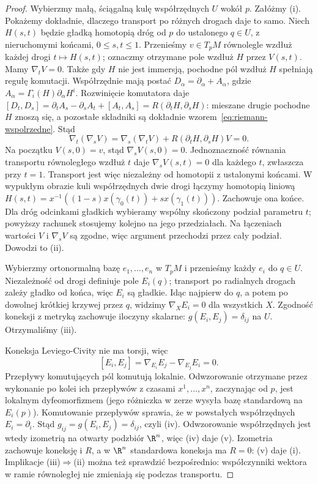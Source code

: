 \begin{proof}
Wybierzmy małą, ściągalną kulę współrzędnych $U$
wokół $p$. Załóżmy (i). Pokażemy dokładnie,
dlaczego transport po różnych drogach daje to samo.
Niech $H(s,t)$ będzie gładką homotopią dróg
od $p$ do ustalonego $q\in U$, z nieruchomymi
końcami, $0\leq s,t\leq1$. Przenieśmy
$v\in T_pM$ równolegle wzdłuż każdej drogi
$t\mapsto H(s,t)$; oznaczmy otrzymane pole
wzdłuż $H$ przez $V(s,t)$. Mamy $\nabla_tV=0$.
Także gdy $H$ nie jest immersją, pochodne pól wzdłuż
$H$ spełniają regułę komutacji. Współrzędnie mają
postać $D_\alpha=\partial_\alpha+A_\alpha$, gdzie
$A_\alpha=\Gamma_i(H)\partial_\alpha H^i$.
Rozwinięcie komutatora daje
$[D_t,D_s]=\partial_tA_s-\partial_sA_t+[A_t,A_s]
=R(\partial_tH,\partial_sH)$: mieszane drugie pochodne
$H$ znoszą się, a pozostałe składniki są dokładnie
wzorem~\eqref{eq:riemann-wspolrzedne}. Stąd
\[
 \nabla_t(\nabla_sV)
 =\nabla_s(\nabla_tV)+R(\partial_tH,\partial_sH)V=0.
\]
Na początku $V(s,0)=v$, stąd $\nabla_sV(s,0)=0$.
Jednoznaczność równania transportu równoległego
wzdłuż $t$ daje $\nabla_sV(s,t)=0$ dla każdego
$t$, zwłaszcza przy $t=1$. Transport jest więc
niezależny od homotopii z ustalonymi końcami.
W wypukłym obrazie kuli współrzędnych dwie drogi
łączymy homotopią liniową
$H(s,t)=x^{-1}((1-s)x(\gamma_0(t))+s x(\gamma_1(t)))$.
Zachowuje ona końce. Dla dróg odcinkami gładkich
wybieramy wspólny skończony podział parametru $t$;
powyższy rachunek stosujemy kolejno na jego przedziałach.
Na łączeniach wartości $V$ i $\nabla_sV$ są zgodne,
więc argument przechodzi przez cały podział. Dowodzi to (ii).

Wybierzmy ortonormalną bazę $e_1,\ldots,e_n$ w $T_pM$
i przenieśmy każdy $e_i$ do $q\in U$. Niezależność
od drogi definiuje pole $E_i(q)$; transport po
radialnych drogach zależy gładko od końca,
więc $E_i$ są gładkie. Idąc najpierw do $q$,
a potem po dowolnej krótkiej krzywej przez $q$,
widzimy $\nabla_XE_i=0$ dla wszystkich $X$.
Zgodność koneksji z metryką zachowuje iloczyny
skalarne: $g(E_i,E_j)=\delta_{ij}$ na $U$.
Otrzymaliśmy (iii).

Koneksja Leviego-Civity nie ma torsji, więc
\[
 [E_i,E_j]=\nabla_{E_i}E_j-\nabla_{E_j}E_i=0.
\]
Przepływy komutujących pól komutują lokalnie.
Odwzorowanie otrzymane przez wykonanie po kolei
ich przepływów z czasami $x^1,\ldots,x^n$,
zaczynając od $p$, jest lokalnym dyfeomorfizmem
(jego różniczka w zerze wysyła bazę standardową
na $E_i(p)$). Komutowanie przepływów sprawia,
że w powstałych współrzędnych $E_i=\partial_i$.
Stąd $g_{ij}=g(E_i,E_j)=\delta_{ij}$, czyli (iv).
Odwzorowanie współrzędnych jest wtedy izometrią
na otwarty podzbiór $\R^n$, więc (iv) daje (v).
Izometria zachowuje koneksję i $R$, a w $\R^n$
standardowa koneksja ma $R=0$: (v) daje (i).
Implikacje (iii)$\Rightarrow$(ii) można też
sprawdzić bezpośrednio: współczynniki wektora
w ramie równoległej nie zmieniają się podczas
transportu.


\end{proof}

